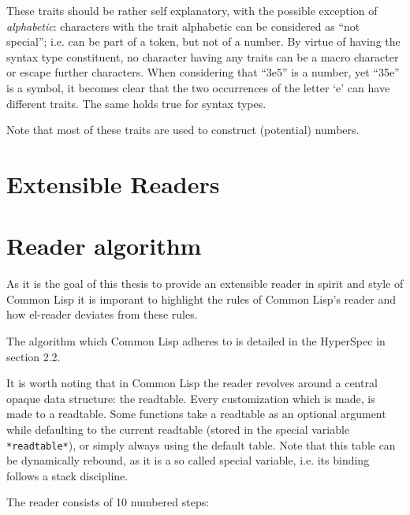 \documentclass[a4paper,10pt,twoside]{report}
\newcommand{\cl}{Common Lisp}
\newcommand{\elr}{el-reader}
\newcommand{\sym}[1]{\texttt{#1}}
\begin{document}
These traits should be rather self explanatory, with the possible exception of
\emph{alphabetic}: characters with the trait alphabetic can be considered as
``not special''; i.e. can be part of a token, but not of a number.  By virtue of
having the syntax type constituent, no character having any traits can be a
macro character or escape further characters.  When considering that ``3e5'' is
a number, yet ``35e'' is a symbol, it becomes clear that the two occurrences of
the letter `e' can have different traits.  The same holds true for syntax types.

Note that most of these traits are used to construct (potential) numbers.

\section{Extensible Readers}
\label{sec:ext-reader}



\section{Reader algorithm}
\label{sec:read-algo}

As it is the goal of this thesis to provide an extensible reader in spirit and
style of \cl{} it is imporant to highlight the rules of \cl{}’s reader and how
\elr{} deviates from these rules.

The algorithm which \cl{} adheres to is detailed in the HyperSpec in section
2.2\cite{hyperspec}.

It is worth noting that in \cl{} the reader revolves around a central opaque
data structure: the readtable.  Every customization which is made, is made to a
readtable.  Some functions take a readtable as an optional argument while
defaulting to the current readtable (stored in the special variable
\sym{*readtable*}), or simply always using the default table.  Note that this
table can be dynamically rebound, as it is a so called special variable,
i.e. its binding follows a stack discipline.

The reader consists of 10 numbered steps:
\end{document}
